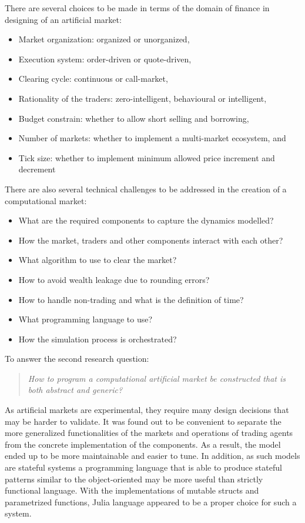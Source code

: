 There are several choices to be made in terms of the domain of finance 
in designing of an artificial market:
\begin{itemize}
    \item Market organization: organized or unorganized,
	\item Execution system: order-driven or quote-driven,
	\item Clearing cycle: continuous or call-market,
    \item Rationality of the traders: zero-intelligent, behavioural or intelligent,
    \item Budget constrain: whether to allow short selling and borrowing, 
    \item Number of markets: whether to implement a multi-market ecosystem, and 
    \item Tick size: whether to implement minimum allowed price increment and decrement
\end{itemize}

There are also several technical challenges to be addressed in the creation 
of a computational market:
\begin{itemize}
    \item What are the required components to capture the dynamics modelled?
	\item How the market, traders and other components interact with each other?
	\item What algorithm to use to clear the market?
	\item How to avoid wealth leakage due to rounding errors?
	\item How to handle non-trading and what is the definition of time?
	\item What programming language to use?
	\item How the simulation process is orchestrated?
\end{itemize}

To answer the second research question:
\begin{quote}
    \textit{How to program a computational artificial market be constructed that is both abstract and generic?} 
\end{quote}

As artificial markets are experimental, they require many design decisions that may be harder to 
validate. It was found out to be convenient to separate the more generalized functionalities of the markets and 
operations of trading agents from the concrete implementation of the components. As a result, the 
model ended up to be more maintainable and easier to tune. In addition, as such models are stateful systems
a programming language that is able to produce stateful patterns similar to the object-oriented may 
be more useful than strictly functional language. With the implementations of mutable structs and parametrized 
functions, Julia language appeared to be a proper choice for such a system.


